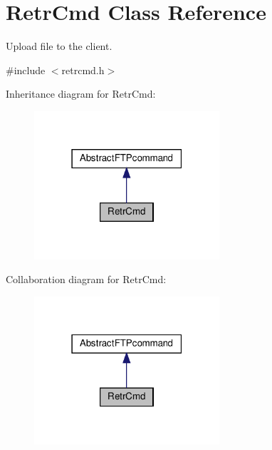 \hypertarget{classRetrCmd}{}\section{Retr\+Cmd Class Reference}
\label{classRetrCmd}


Upload file to the client.  




{\ttfamily \#include $<$retrcmd.\+h$>$}



Inheritance diagram for Retr\+Cmd\+:\nopagebreak
\begin{figure}[H]
\begin{center}
\leavevmode
\includegraphics[width=195pt]{d0/dae/classRetrCmd__inherit__graph}
\end{center}
\end{figure}


Collaboration diagram for Retr\+Cmd\+:\nopagebreak
\begin{figure}[H]
\begin{center}
\leavevmode
\includegraphics[width=195pt]{dc/d68/classRetrCmd__coll__graph}
\end{center}
\end{figure}
